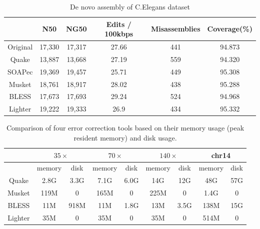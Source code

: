 \documentclass{bmcart}
\begin{document}
\begin{backmatter}
\begin{table}[h!] %
\caption{De novo assembly of C.Elegans dataset}
\begin{tabular}{|c|c|c|c|c|c|} \hline
	   & N50 &	NG50	& Edits / 100kbps &	Misassemblies	& Coverage(\%) \\ \hline
Original &	17,330	& 17,317	& 27.66	& 441& 	94.873 \\ \hline
Quake	&	13,887	& 13,668	& 27.19	& 559	& 94.320 \\ \hline
SOAPec  & 19,369	& 19,457	& 25.71	& 449	& 95.308 \\ \hline
Musket	&	18,761	& 18,917	& 28.02	& 438	& 95.288 \\ \hline
BLESS	&	17,673	& 17,693	& 29.24	& 524	& 94.968 \\ \hline
Lighter	&	19,222	& 19,333	& 26.9	& 434	& 95.332 \\ \hline
\end{tabular}
\end{table}

\begin{table}[h!] %
\caption{Comparison of four error correction tools based on their memory usage (peak resident memory) and disk usage.\label{table:memory_usage}}
\begin{tabular}{|c|c|c||c|c||c|c||c|c|} \hline
		& \multicolumn{2}{|c||}{$35\times$} & \multicolumn{2}{|c||}{$70\times$}  & \multicolumn{2}{|c||}{$140\times$} & \multicolumn{2}{|c|}{chr14}  \\ \hline
		& memory & disk & memory & disk & memory & disk & memory & disk \\ \hline
Quake   & 2.8G	& 3.3G & 7.1G & 6.0G & 14G & 12G & 48G & 57G \\ \hline		
Musket	& 119M	& 0 & 165M & 0 & 225M & 0 & 1.4G & 0 \\ \hline
BLESS	& 11M	& 918M & 11M & 1.8G & 13M & 3.5G & 138M & 15G \\ \hline
Lighter	& 35M	& 0 & 35M & 0 & 35M & 0 & 514M & 0 \\ \hline
\end{tabular}
\end{table}

\end{backmatter}
\end{document}
